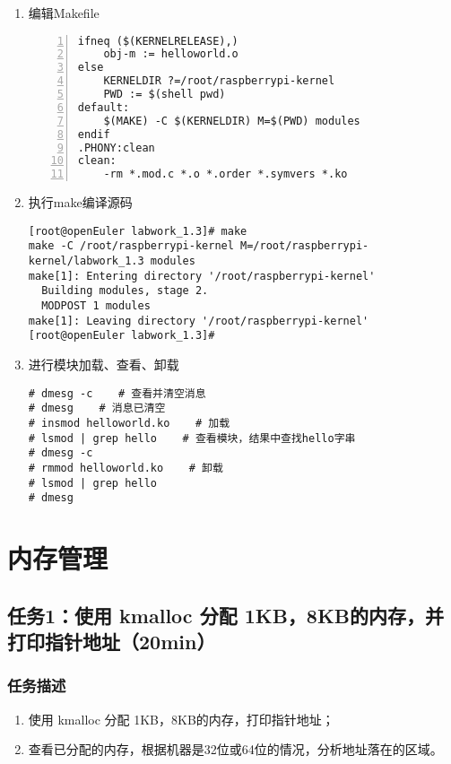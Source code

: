 \documentclass{article}
\begin{document}
\begin{enumerate}
\begin{lstlisting}[numbers=left]
int __init hello_init(void) {
	printk("hello init\n");
	printk("hello,world!\n");
	return 0;
}
void __exit hello_exit(void) {
	printk("hello exit\n");
}
module_init(hello_init);
module_exit(hello_exit);
\end{lstlisting}  
    \item 编辑Makefile
\begin{lstlisting}[numbers=left]
ifneq ($(KERNELRELEASE),)
	obj-m := helloworld.o
else
	KERNELDIR ?=/root/raspberrypi-kernel
	PWD := $(shell pwd)
default:
	$(MAKE) -C $(KERNELDIR) M=$(PWD) modules
endif
.PHONY:clean
clean:
	-rm *.mod.c *.o *.order *.symvers *.ko
\end{lstlisting}
\item 执行make编译源码
\begin{lstlisting}
[root@openEuler labwork_1.3]# make
make -C /root/raspberrypi-kernel M=/root/raspberrypi-
kernel/labwork_1.3 modules
make[1]: Entering directory '/root/raspberrypi-kernel'
  Building modules, stage 2.
  MODPOST 1 modules
make[1]: Leaving directory '/root/raspberrypi-kernel'
[root@openEuler labwork_1.3]#
\end{lstlisting}
    \item 进行模块加载、查看、卸载
\begin{lstlisting}
# dmesg -c    # 查看并清空消息
# dmesg    # 消息已清空
# insmod helloworld.ko    # 加载
# lsmod | grep hello    # 查看模块，结果中查找hello字串
# dmesg -c
# rmmod helloworld.ko    # 卸载
# lsmod | grep hello
# dmesg
\end{lstlisting}
\end{enumerate}

\newpage
\section{内存管理}
\subsection{任务1：使用 kmalloc 分配 1KB，8KB的内存，并打印指针地址（20min）}
\subsubsection{任务描述}
\begin{enumerate}
    \item 使用 kmalloc 分配 1KB，8KB的内存，打印指针地址；
    \item 查看已分配的内存，根据机器是32位或64位的情况，分析地址落在的区域。
\end{enumerate}
\end{document}
